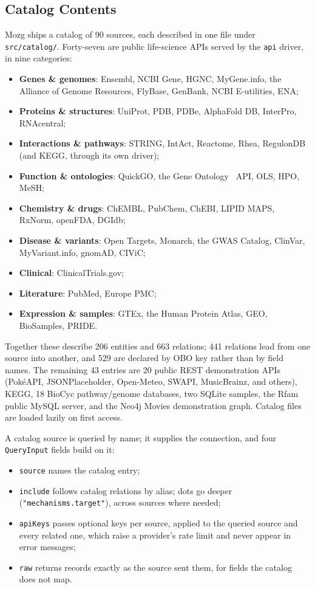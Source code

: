 \documentclass[sigconf,nonacm]{acmart}
\begin{document}
\subsection{Catalog Contents}

Mozg ships a catalog of 90 sources, each described in one file under
\texttt{src/catalog/}.  Forty-seven are public life-science APIs served
by the \texttt{api} driver, in nine categories:

\begin{itemize}
  \item \textbf{Genes \& genomes}: Ensembl, NCBI Gene, HGNC, MyGene.info,
        the Alliance of Genome Resources, FlyBase, GenBank, NCBI
        E-utilities, ENA;
  \item \textbf{Proteins \& structures}: UniProt, PDB, PDBe, AlphaFold
        DB, InterPro, RNAcentral;
  \item \textbf{Interactions \& pathways}: STRING, IntAct, Reactome,
        Rhea, RegulonDB (and KEGG, through its own driver);
  \item \textbf{Function \& ontologies}: QuickGO, the Gene
        Ontology~\cite{go} API, OLS, HPO, MeSH;
  \item \textbf{Chemistry \& drugs}: ChEMBL, PubChem, ChEBI, LIPID MAPS,
        RxNorm, openFDA, DGIdb;
  \item \textbf{Disease \& variants}: Open Targets, Monarch, the GWAS
        Catalog, ClinVar, MyVariant.info, gnomAD, CIViC;
  \item \textbf{Clinical}: ClinicalTrials.gov;
  \item \textbf{Literature}: PubMed, Europe PMC;
  \item \textbf{Expression \& samples}: GTEx, the Human Protein Atlas,
        GEO, BioSamples, PRIDE.
\end{itemize}

Together these describe 206 entities and 663 relations; 441 relations
lead from one source into another, and 529 are declared by OBO key
rather than by field names.  The remaining 43 entries are 20 public
REST demonstration APIs (PokéAPI, JSONPlaceholder, Open-Meteo, SWAPI,
MusicBrainz, and others), KEGG, 18 BioCyc pathway/genome databases,
two SQLite samples, the Rfam public MySQL server, and the Neo4j Movies
demonstration graph.  Catalog files are loaded lazily on first access.

A catalog source is queried by name; it supplies the connection, and
four \texttt{QueryInput} fields build on it:
\begin{itemize}
  \item \texttt{source} names the catalog entry;
  \item \texttt{include} follows catalog relations by alias; dots go
        deeper (\texttt{"mechanisms.target"}), across sources where
        needed;
  \item \texttt{apiKeys} passes optional keys per source, applied to the
        queried source and every related one, which raise a provider's
        rate limit and never appear in error messages;
  \item \texttt{raw} returns records exactly as the source sent them,
        for fields the catalog does not map.
\end{itemize}
\end{document}
